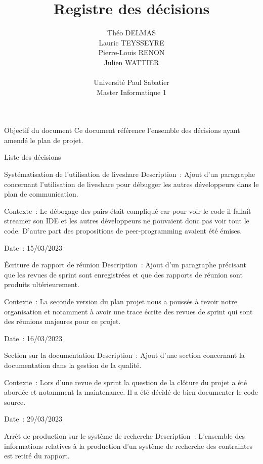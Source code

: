 \documentclass[]{article}
\title{Registre des décisions}
\author{
    Théo DELMAS\\
    Lauric TEYSSEYRE\\
    Pierre-Louis RENON\\
    Julien WATTIER\\
    \\
    Université Paul Sabatier\\
    Master Informatique 1\\
   }
\begin{document}
\maketitle
\newpage
\tableofcontents
\newpage

\begin{section}{Objectif du document}
 Ce document référence l'ensemble des décisions ayant amendé le plan de projet.
\end{section}

{
\setlength{\parindent}{0pt} %
\begin{section}{Liste des décisions}
 \begin{subsection}{Systématisation de l’utilisation de liveshare}
     Description : Ajout d’un paragraphe concernant l’utilisation de liveshare pour débugger les autres développeurs dans le plan de communication.

     Contexte : Le débogage des pairs était compliqué car pour voir le code il fallait streamer son IDE et les autres développeurs ne pouvaient donc pas voir tout le code. D’autre part des propositions de peer-programming avaient été émises.

     Date : 15/03/2023
 \end{subsection}
 \begin{subsection}{Écriture de rapport de réunion}
     Description : Ajout d’un paragraphe précisant que les revues de sprint sont enregistrées et que des rapports de réunion sont produits ultérieurement.

     Contexte : La seconde version du plan projet nous a poussés à revoir notre organisation et notamment à avoir une trace écrite des revues de sprint qui sont des réunions majeures pour ce projet.

     Date : 16/03/2023
 \end{subsection}
 \begin{subsection}{Section sur la documentation}
     Description : Ajout d’une section concernant la documentation dans la gestion de la qualité.

     Contexte : Lors d’une revue de sprint la question de la clôture du projet a été abordée et notamment la maintenance. Il a été décidé de bien documenter le code source.

     Date : 29/03/2023
 \end{subsection}
 \begin{subsection}{Arrêt de production sur le système de recherche}
     Description : L’ensemble des informations relatives à la production d’un système de recherche des contraintes est retiré du rapport.


\end{subsection}
\end{section}}
\end{document}
